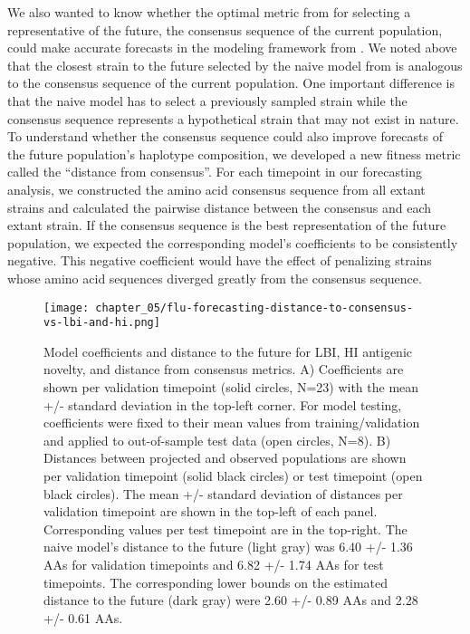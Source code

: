 We also wanted to know whether the optimal metric from \citet{Barrat-Charlaix2020} for selecting a representative of the future, the consensus sequence of the current population, could make accurate forecasts in the modeling framework from \citet{Huddleston2020}.
We noted above that the closest strain to the future selected by the naive model from \citet{Huddleston2020} is analogous to the consensus sequence of the current population.
One important difference is that the naive model has to select a previously sampled strain while the consensus sequence represents a hypothetical strain that may not exist in nature.
To understand whether the consensus sequence could also improve forecasts of the future population's haplotype composition, we developed a new fitness metric called the ``distance from consensus''.
For each timepoint in our forecasting analysis, we constructed the amino acid consensus sequence from all extant strains and calculated the pairwise distance between the consensus and each extant strain.
If the consensus sequence is the best representation of the future population, we expected the corresponding model's coefficients to be consistently negative.
This negative coefficient would have the effect of penalizing strains whose amino acid sequences diverged greatly from the consensus sequence.

\begin{figure}
  \centering
  \texttt{[image: chapter\_05/flu-forecasting-distance-to-consensus-vs-lbi-and-hi.png]}
  \caption{Model coefficients and distance to the future for LBI, HI antigenic novelty, and distance from consensus metrics.
    A) Coefficients are shown per validation timepoint (solid circles, N=23) with the mean +/- standard deviation in the top-left corner.
    For model testing, coefficients were fixed to their mean values from training/validation and applied to out-of-sample test data (open circles, N=8).
    B) Distances between projected and observed populations are shown per validation timepoint (solid black circles) or test timepoint (open black circles).
    The mean +/- standard deviation of distances per validation timepoint are shown in the top-left of each panel.
    Corresponding values per test timepoint are in the top-right.
    The naive model's distance to the future (light gray) was 6.40 +/- 1.36 AAs for validation timepoints and 6.82 +/- 1.74 AAs for test timepoints.
    The corresponding lower bounds on the estimated distance to the future (dark gray) were 2.60 +/- 0.89 AAs and 2.28 +/- 0.61 AAs.\label{fig:distance-to-consensus-performance} }
\end{figure}


